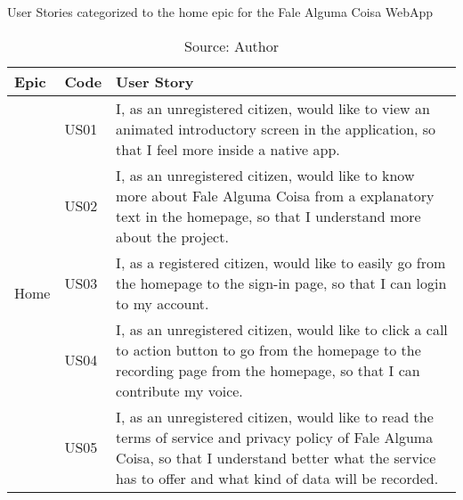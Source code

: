 \begin{table}[h]
\caption{User Stories categorized to the home epic for the Fale Alguma Coisa WebApp}
\label{tab:falealgumacoisa-home-epic}
\centering
\begin{tabular}{|p{2cm}|p{1cm}|p{10cm}|}
\hline
Epic & Code & User Story \\ \hline
\multirow{5}{*}{Home} 
    & US01 & I, as an unregistered citizen, would like to view an animated introductory screen in the application, so that I feel more inside a native app. \\ \cline{2-3} 
    & US02 & I, as an unregistered citizen, would like to know more about Fale Alguma Coisa from a explanatory text in the homepage, so that I understand more about the project. \\ \cline{2-3} 
    & US03 & I, as a registered citizen, would like to easily go from the homepage to the sign-in page, so that I can login to my account. \\ \cline{2-3} 
    & US04 & I, as an unregistered citizen, would like to click a call to action button to go from the homepage to the recording page from the homepage, so that I can contribute my voice. \\ \cline{2-3} 
    & US05 & I, as an unregistered citizen, would like to read the terms of service and privacy policy of Fale Alguma Coisa, so that I understand better what the service has to offer and what kind of data will be recorded. \\ \hline
\end{tabular}
\caption*{Source: Author}
\end{table}

